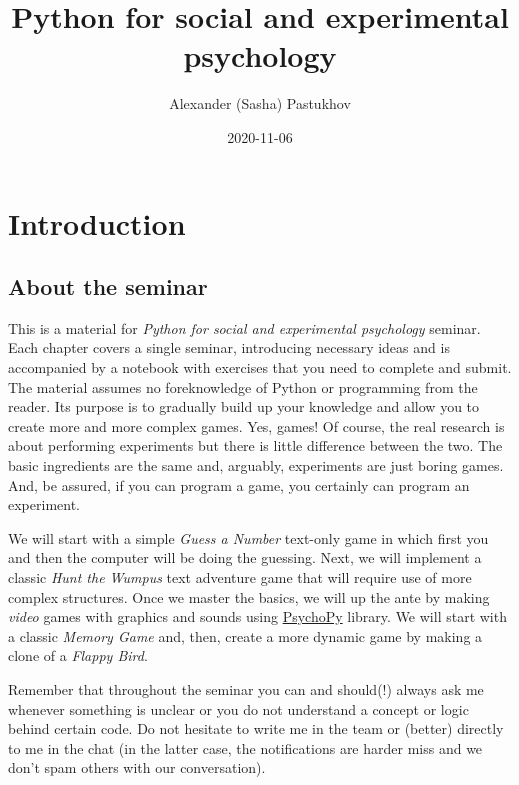 \documentclass[
]{book}
\title{Python for social and experimental psychology}
\author{Alexander (Sasha) Pastukhov}
\date{2020-11-06}
\begin{document}
\maketitle

{
\setcounter{tocdepth}{1}
\tableofcontents
}
\hypertarget{introduction}{%
\chapter*{Introduction}\label{introduction}}

\hypertarget{about-the-seminar}{%
\section*{About the seminar}\label{about-the-seminar}}

This is a material for \emph{Python for social and experimental psychology} seminar. Each chapter covers a single seminar, introducing necessary ideas and is accompanied by a notebook with exercises that you need to complete and submit. The material assumes no foreknowledge of Python or programming from the reader. Its purpose is to gradually build up your knowledge and allow you to create more and more complex games. Yes, games! Of course, the real research is about performing experiments but there is little difference between the two. The basic ingredients are the same and, arguably, experiments are just boring games. And, be assured, if you can program a game, you certainly can program an experiment.

We will start with a simple \emph{Guess a Number} text-only game in which first you and then the computer will be doing the guessing. Next, we will implement a classic \emph{Hunt the Wumpus} text adventure game that will require use of more complex structures. Once we master the basics, we will up the ante by making \emph{video} games with graphics and sounds using \href{https://psychopy.org/}{PsychoPy} library. We will start with a classic \emph{Memory Game} and, then, create a more dynamic game by making a clone of a \emph{Flappy Bird}.

Remember that throughout the seminar you can and should(!) always ask me whenever something is unclear or you do not understand a concept or logic behind certain code. Do not hesitate to write me in the team or (better) directly to me in the chat (in the latter case, the notifications are harder miss and we don't spam others with our conversation).
\end{document}
